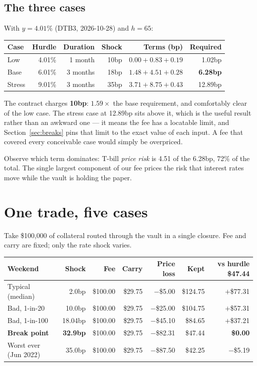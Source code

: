 \documentclass[11pt,a4paper]{article}
\begin{document}
\subsection{The three cases}

With $y=4.01\%$ (DTB3, 2026-10-28) and $h=65$:

\begin{center}
\small
\begin{tabular}{@{}lrrrrr@{}}
\toprule
\textbf{Case} & \textbf{Hurdle} & \textbf{Duration} & \textbf{Shock} & \textbf{Terms (bp)} & \textbf{Required} \\
\midrule
Low    & 4.01\% & 1 month  & 10bp & $0.00+0.83+0.19$ & 1.02bp \\
Base   & 6.01\% & 3 months & 18bp & $1.48+4.51+0.28$ & \textbf{6.28bp} \\
Stress & 9.01\% & 3 months & 35bp & $3.71+8.75+0.43$ & 12.89bp \\
\bottomrule
\end{tabular}
\end{center}

The contract charges \textbf{10bp}: $1.59\times$ the base requirement, and comfortably
clear of the low case. The stress case at 12.89bp sits above it, which is the useful
result rather than an awkward one — it means the fee has a locatable limit, and
Section~\ref{sec:breaks} pins that limit to the exact value of each input. A fee that
covered every conceivable case would simply be overpriced.

Observe which term dominates: T-bill \emph{price risk} is 4.51 of the 6.28bp, 72\% of the
total. The single largest component of our fee prices the risk that interest rates move
while the vault is holding the paper.

\section{One trade, five cases}

Take \$100{,}000 of collateral routed through the vault in a single closure. Fee and carry
are fixed; only the rate shock varies.

\begin{center}
\small
\begin{tabular}{@{}lrrrrrr@{}}
\toprule
\textbf{Weekend} & \textbf{Shock} & \textbf{Fee} & \textbf{Carry} & \textbf{Price loss} & \textbf{Kept} & \textbf{vs hurdle \$47.44} \\
\midrule
Typical (median)      & 2.0bp  & \$100.00 & \$29.75 & $-$\$5.00  & \$124.75 & $+$\$77.31 \\
Bad, 1-in-20          & 10.0bp & \$100.00 & \$29.75 & $-$\$25.00 & \$104.75 & $+$\$57.31 \\
Bad, 1-in-100         & 18.04bp & \$100.00 & \$29.75 & $-$\$45.10 & \$84.65  & $+$\$37.21 \\
\textbf{Break point}  & \textbf{32.9bp} & \$100.00 & \$29.75 & $-$\$82.31 & \$47.44 & \textbf{\$0.00} \\
Worst ever (Jun 2022) & 35.0bp & \$100.00 & \$29.75 & $-$\$87.50 & \$42.25  & $-$\$5.19 \\
\bottomrule
\end{tabular}
\end{center}
\end{document}
